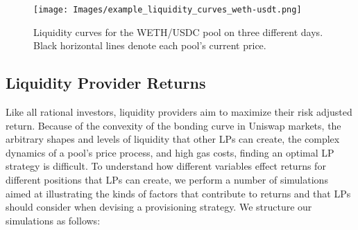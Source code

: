\documentclass[11pt]{article}
\begin{document}
\begin{figure}[H]
    \centering
    \texttt{[image: Images/example\_liquidity\_curves\_weth-usdt.png]}
    \caption{Liquidity curves for the WETH/USDC pool on three different days. Black horizontal lines denote each pool's current price.}
    \label{fig:example_liquidity_curves_usdc-weth}
\end{figure}

\subsection{Liquidity Provider Returns}

Like all rational investors, liquidity providers aim to maximize their risk adjusted return. Because of the convexity of the bonding curve in Uniswap markets, the arbitrary shapes and levels of liquidity that other LPs can create, the complex dynamics of a pool's price process, and high gas costs, finding an optimal LP strategy is difficult. To understand how different variables effect returns for different positions that LPs can create, we perform a number of simulations aimed at illustrating the kinds of factors that contribute to returns and that LPs should consider when devising a provisioning strategy. We structure our simulations as follows:
\end{document}
